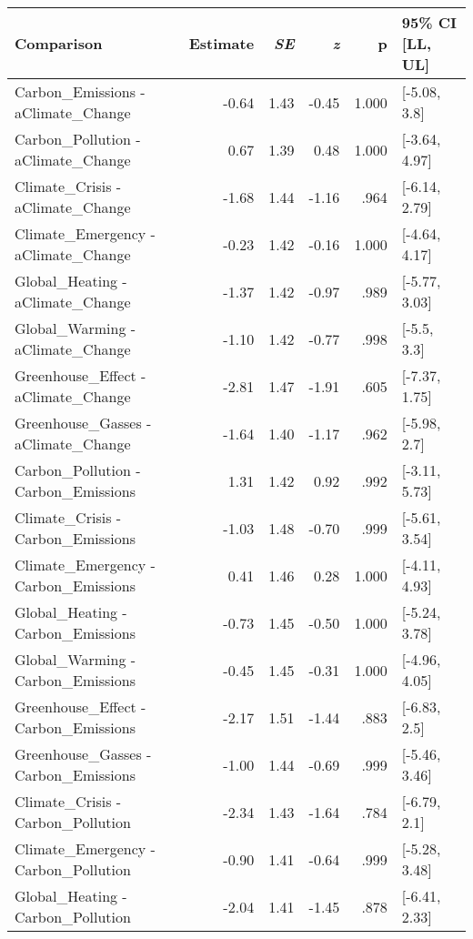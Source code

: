 \begin{table}[ht]
\centering
\begin{tabular}{lrrrrl}
  \hline
Comparison & Estimate & \textit{SE} & \textit{z} & p & 95\% CI [LL, UL] \\ 
  \hline
Carbon\_Emissions - aClimate\_Change & -0.64 & 1.43 & -0.45 & 1.000 & [-5.08, 3.8] \\ 
  Carbon\_Pollution - aClimate\_Change & 0.67 & 1.39 & 0.48 & 1.000 & [-3.64, 4.97] \\ 
  Climate\_Crisis - aClimate\_Change & -1.68 & 1.44 & -1.16 & .964 & [-6.14, 2.79] \\ 
  Climate\_Emergency - aClimate\_Change & -0.23 & 1.42 & -0.16 & 1.000 & [-4.64, 4.17] \\ 
  Global\_Heating - aClimate\_Change & -1.37 & 1.42 & -0.97 & .989 & [-5.77, 3.03] \\ 
  Global\_Warming - aClimate\_Change & -1.10 & 1.42 & -0.77 & .998 & [-5.5, 3.3] \\ 
  Greenhouse\_Effect - aClimate\_Change & -2.81 & 1.47 & -1.91 & .605 & [-7.37, 1.75] \\ 
  Greenhouse\_Gasses - aClimate\_Change & -1.64 & 1.40 & -1.17 & .962 & [-5.98, 2.7] \\ 
  Carbon\_Pollution - Carbon\_Emissions & 1.31 & 1.42 & 0.92 & .992 & [-3.11, 5.73] \\ 
  Climate\_Crisis - Carbon\_Emissions & -1.03 & 1.48 & -0.70 & .999 & [-5.61, 3.54] \\ 
  Climate\_Emergency - Carbon\_Emissions & 0.41 & 1.46 & 0.28 & 1.000 & [-4.11, 4.93] \\ 
  Global\_Heating - Carbon\_Emissions & -0.73 & 1.45 & -0.50 & 1.000 & [-5.24, 3.78] \\ 
  Global\_Warming - Carbon\_Emissions & -0.45 & 1.45 & -0.31 & 1.000 & [-4.96, 4.05] \\ 
  Greenhouse\_Effect - Carbon\_Emissions & -2.17 & 1.51 & -1.44 & .883 & [-6.83, 2.5] \\ 
  Greenhouse\_Gasses - Carbon\_Emissions & -1.00 & 1.44 & -0.69 & .999 & [-5.46, 3.46] \\ 
  Climate\_Crisis - Carbon\_Pollution & -2.34 & 1.43 & -1.64 & .784 & [-6.79, 2.1] \\ 
  Climate\_Emergency - Carbon\_Pollution & -0.90 & 1.41 & -0.64 & .999 & [-5.28, 3.48] \\ 
  Global\_Heating - Carbon\_Pollution & -2.04 & 1.41 & -1.45 & .878 & [-6.41, 2.33] \\ 

\end{tabular}
\end{table}
